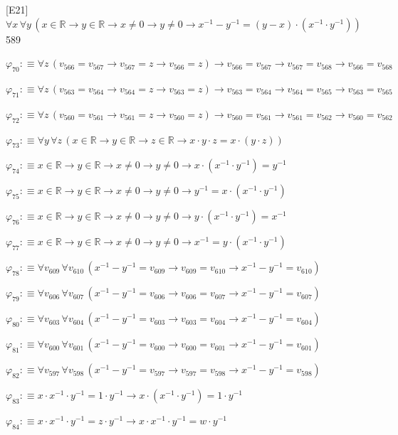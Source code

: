 \begin{fullproof}{[E21]}{$\forall x\,\forall y\,(x \in \mathbb{R} \to y \in \mathbb{R} \to x \neq 0 \to y \neq 0 \to x^{-1} - y^{-1} = (y - x) \cdot (x^{-1} \cdot y^{-1}))$}{589}
\begin{abbrevlist}
\item $\varphi_{70} :\equiv \forall z\,(v_{566} = v_{567} \to v_{567} = z \to v_{566} = z) \to v_{566} = v_{567} \to v_{567} = v_{568} \to v_{566} = v_{568}$
\item $\varphi_{71} :\equiv \forall z\,(v_{563} = v_{564} \to v_{564} = z \to v_{563} = z) \to v_{563} = v_{564} \to v_{564} = v_{565} \to v_{563} = v_{565}$
\item $\varphi_{72} :\equiv \forall z\,(v_{560} = v_{561} \to v_{561} = z \to v_{560} = z) \to v_{560} = v_{561} \to v_{561} = v_{562} \to v_{560} = v_{562}$
\item $\varphi_{73} :\equiv \forall y\,\forall z\,(x \in \mathbb{R} \to y \in \mathbb{R} \to z \in \mathbb{R} \to x \cdot y \cdot z = x \cdot (y \cdot z))$
\item $\varphi_{74} :\equiv x \in \mathbb{R} \to y \in \mathbb{R} \to x \neq 0 \to y \neq 0 \to x \cdot (x^{-1} \cdot y^{-1}) = y^{-1}$
\item $\varphi_{75} :\equiv x \in \mathbb{R} \to y \in \mathbb{R} \to x \neq 0 \to y \neq 0 \to y^{-1} = x \cdot (x^{-1} \cdot y^{-1})$
\item $\varphi_{76} :\equiv x \in \mathbb{R} \to y \in \mathbb{R} \to x \neq 0 \to y \neq 0 \to y \cdot (x^{-1} \cdot y^{-1}) = x^{-1}$
\item $\varphi_{77} :\equiv x \in \mathbb{R} \to y \in \mathbb{R} \to x \neq 0 \to y \neq 0 \to x^{-1} = y \cdot (x^{-1} \cdot y^{-1})$
\item $\varphi_{78} :\equiv \forall v_{609}\,\forall v_{610}\,(x^{-1} - y^{-1} = v_{609} \to v_{609} = v_{610} \to x^{-1} - y^{-1} = v_{610})$
\item $\varphi_{79} :\equiv \forall v_{606}\,\forall v_{607}\,(x^{-1} - y^{-1} = v_{606} \to v_{606} = v_{607} \to x^{-1} - y^{-1} = v_{607})$
\item $\varphi_{80} :\equiv \forall v_{603}\,\forall v_{604}\,(x^{-1} - y^{-1} = v_{603} \to v_{603} = v_{604} \to x^{-1} - y^{-1} = v_{604})$
\item $\varphi_{81} :\equiv \forall v_{600}\,\forall v_{601}\,(x^{-1} - y^{-1} = v_{600} \to v_{600} = v_{601} \to x^{-1} - y^{-1} = v_{601})$
\item $\varphi_{82} :\equiv \forall v_{597}\,\forall v_{598}\,(x^{-1} - y^{-1} = v_{597} \to v_{597} = v_{598} \to x^{-1} - y^{-1} = v_{598})$
\item $\varphi_{83} :\equiv x \cdot x^{-1} \cdot y^{-1} = 1 \cdot y^{-1} \to x \cdot (x^{-1} \cdot y^{-1}) = 1 \cdot y^{-1}$
\item $\varphi_{84} :\equiv x \cdot x^{-1} \cdot y^{-1} = z \cdot y^{-1} \to x \cdot x^{-1} \cdot y^{-1} = w \cdot y^{-1}$

\end{abbrevlist}
\end{fullproof}
